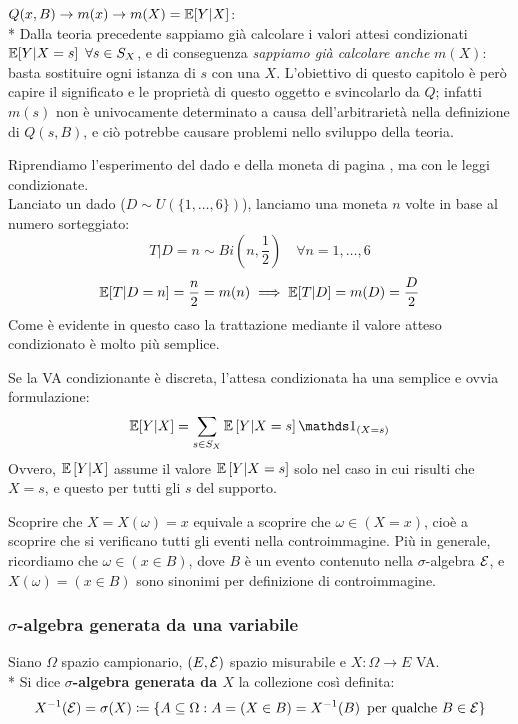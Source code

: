 \medskip
\begin{nb}
  $Q(x,B) \to m(x) \to m(X) = \mathbb E[Y|X]$:\\*
  Dalla teoria precedente sappiamo già calcolare i valori attesi condizionati $\mathbb E[Y|X = s] \ \, \forall s \in S_X$, e di conseguenza \emph{sappiamo già calcolare anche} $m(X)$: basta sostituire ogni istanza di $s$ con una $X$.
  L'obiettivo di questo capitolo è però capire il significato e le proprietà di questo oggetto e svincolarlo da $Q$;
  infatti $m(s)$ non è univocamente determinato a causa dell'arbitrarietà nella definizione di $Q(s,B)$, e ciò potrebbe causare problemi nello sviluppo della teoria.
\end{nb}

\medskip
\begin{ese}\label{ese-dadi-monete-teste-2}
  Riprendiamo l'esperimento del dado e della moneta di pagina \pageref{ese-dadi-monete-teste}, ma con le leggi condizionate. \\
  Lanciato un dado ($D \sim U(\{1, \dots, 6\})$), lanciamo una moneta $n$ volte in base al numero sorteggiato:
  $$T|D = n \sim Bi\left(n, \frac{1}{2}\right) \quad \forall n = 1, \dots, 6$$
  $$ \mathbb E[T|D=n] = \frac{n}{2} = m(n) \implies \mathbb E[T|D] = m(D) = \frac{D}{2}$$
  Come è evidente in questo caso la trattazione mediante il valore atteso condizionato è molto più semplice.
\end{ese}

\medskip
\begin{nb}
  Se la VA condizionante è discreta, l'attesa condizionata ha una semplice e ovvia formulazione:
  $$\EE [Y|X] = \sum\limits_{s \in S_X} \EE\left[Y|X=s\right] \Ind_{(X = s)}$$
  Ovvero, $\mathbb E \left[ Y|X \right]$ assume il valore $\mathbb E \left[ Y|X=s \right]$ solo nel caso in cui risulti che $X=s$, e questo per tutti gli $s$ del supporto.
\end{nb}

\medskip
Scoprire che $X = X(\omega) = x$ equivale a scoprire che $\omega \in (X = x)$, cioè a scoprire che si verificano tutti gli eventi nella controimmagine.
Più in generale, ricordiamo che $\omega \in (x \in B)$, dove $B$ è un evento contenuto nella $\sigma$-algebra $\mathcal E$, e $X(\omega) = (x \in B)$ sono sinonimi per definizione di controimmagine.

\subsubsection{$\sigma$-algebra generata da una variabile}
\begin{defn}
  Siano $\Omega$ spazio campionario, $(E, \mathcal E)$ spazio misurabile e $X:\Omega \to E$ VA. \\*
  Si dice \textbf{$\sigma$-algebra generata da $X$} la collezione così definita:
  $$X^{-1}(\mathcal E) = \sigma(X) \coloneqq \{A \subseteq \Omega: A = (X \in B) = X^{-1}(B) \, \text{ per qualche } B \in \mathcal E\}$$
\end{defn}

